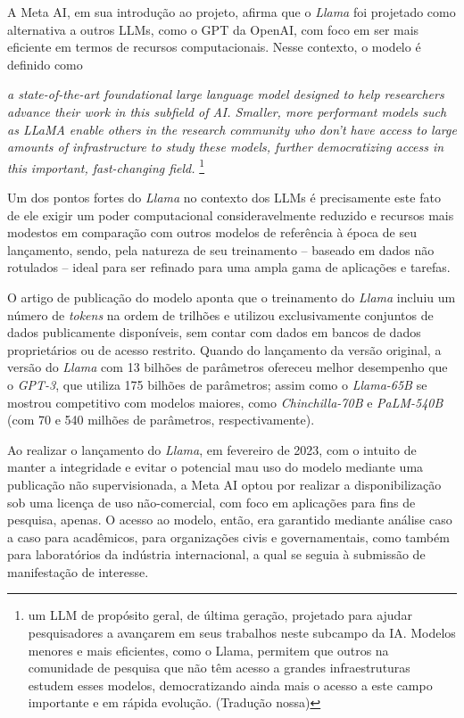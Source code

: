 A Meta AI, em sua introdução ao projeto, afirma que o \textit{Llama} foi projetado como alternativa a outros \ac{LLM}s, como o GPT da OpenAI, com foco em ser mais eficiente em termos de recursos computacionais. Nesse contexto, o modelo é definido como
\begin{citacao}
    \textit{a state-of-the-art foundational large language model designed to help researchers advance their work in this subfield of AI. Smaller, more performant models such as LLaMA enable others in the research community who don’t have access to large amounts of infrastructure to study these models, further democratizing access in this important, fast-changing field.} \cite{Llama:2} \footnote{um LLM de propósito geral, de última geração, projetado para ajudar pesquisadores a avançarem em seus trabalhos neste subcampo da IA. Modelos menores e mais eficientes, como o Llama, permitem que outros na comunidade de pesquisa que não têm acesso a grandes infraestruturas estudem esses modelos, democratizando ainda mais o acesso a este campo importante e em rápida evolução. (Tradução nossa)}
\end{citacao}

Um dos pontos fortes do \textit{Llama} no contexto dos \ac{LLM}s é precisamente este fato de ele exigir um poder computacional consideravelmente reduzido e recursos mais modestos em comparação com outros modelos de referência à época de seu lançamento, sendo, pela natureza de seu treinamento -- baseado em dados não rotulados -- ideal para ser refinado para uma ampla gama de aplicações e tarefas.

O artigo de publicação do modelo aponta que o treinamento do \textit{Llama} incluiu um número de \textit{tokens} na ordem de trilhões e utilizou exclusivamente conjuntos de dados publicamente disponíveis, sem contar com dados em bancos de dados proprietários ou de acesso restrito. Quando do lançamento da versão original, a versão do \textit{Llama} com 13 bilhões de parâmetros ofereceu melhor desempenho que o \textit{GPT-3}, que utiliza 175 bilhões de parâmetros; assim como o \textit{Llama-65B} se mostrou  competitivo com modelos maiores, como \textit{Chinchilla-70B} e \textit{PaLM-540B} (com 70 e 540 milhões de parâmetros, respectivamente).

Ao realizar o lançamento do \textit{Llama}, em fevereiro de 2023, com o intuito de manter a integridade e evitar o potencial mau uso do modelo mediante uma publicação não supervisionada, a Meta AI optou por realizar a disponibilização sob uma licença de uso não-comercial, com foco em aplicações para fins de pesquisa, apenas. O acesso ao modelo, então, era garantido mediante análise caso a caso para acadêmicos, para organizações civis e governamentais, como também para laboratórios da indústria internacional, a qual se seguia à submissão de manifestação de interesse.

